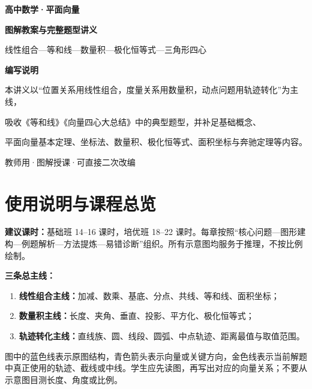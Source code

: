 \documentclass[11pt,a4paper,openany]{ctexbook}
\begin{document}
\frontmatter
\begin{titlepage}
\centering
\vspace*{2.2cm}
{\Huge\bfseries\sffamily\color{navy} 高中数学·平面向量}\par
\vspace{0.5cm}
{\LARGE\bfseries\sffamily\color{teal}图解教案与完整题型讲义}\par
\vspace{0.8cm}
{\large 线性组合—等和线—数量积—极化恒等式—三角形四心}\par
\vfill
\begin{tcolorbox}[width=.82\textwidth,colback=bluegray,colframe=navy,arc=3mm]
\centering
\textbf{编写说明}\par
本讲义以“位置关系用线性组合，度量关系用数量积，动点问题用轨迹转化”为主线，\par
吸收《等和线》《向量四心大总结》中的典型题型，并补足基础概念、\par
平面向量基本定理、坐标法、数量积、极化恒等式、面积坐标与奔驰定理等内容。
\end{tcolorbox}
\vfill
{\large 教师用·图解授课·可直接二次改编}\par
\vspace*{1.5cm}
\end{titlepage}

\chapter*{使用说明与课程总览}

\begin{teachbox}
\textbf{建议课时：}基础班 14--16 课时，培优班 18--22 课时。每章按照“核心问题—图形建构—例题解析—方法提炼—易错诊断”组织。所有示意图均服务于推理，不按比例绘制。

\textbf{三条总主线：}
\begin{enumerate}
  \item \textbf{线性组合主线：}加减、数乘、基底、分点、共线、等和线、面积坐标；
  \item \textbf{数量积主线：}长度、夹角、垂直、投影、平方化、极化恒等式；
  \item \textbf{轨迹转化主线：}直线族、圆、线段、圆弧、中点轨迹、距离最值与取值范围。
\end{enumerate}
\end{teachbox}

\begin{methodbox}[title={图示阅读规则}]
图中的蓝色线表示原图结构，青色箭头表示向量或关键方向，金色线表示当前解题中真正使用的轨迹、截线或中线。学生应先读图，再写出对应的向量关系；不要从示意图目测长度、角度或比例。
\end{methodbox}
\end{document}
